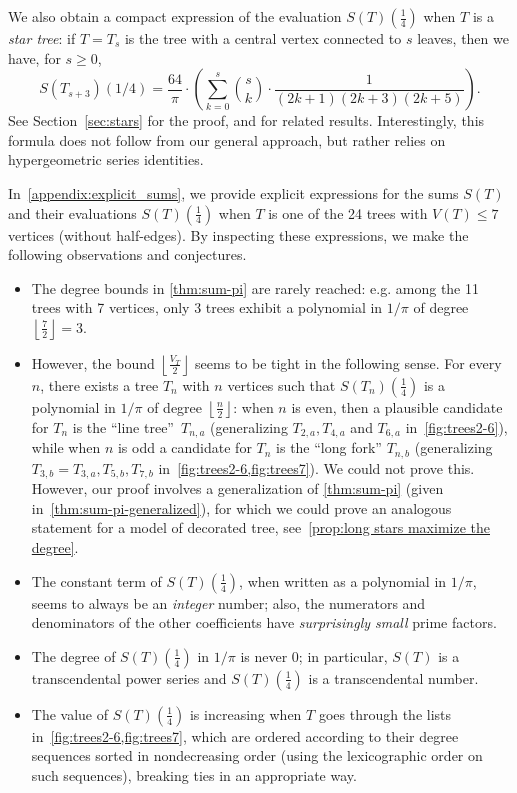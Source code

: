 \documentclass[12pt]{amsart}
\theoremstyle{plain}
\theoremstyle{remark}
\begin{document}
We also obtain a compact expression of the evaluation $S ( T )(\frac{1}{4})$ when $T$ is a \emph{star tree}: if $T=T_s$ is the tree
with a central vertex connected to $s$ leaves, then we have, for $s\geq 0$,
\begin{equation}
\label{eq:stars}
S(T_{s+3})(1/4)  = 
\frac{64}{\pi} \cdot \left(
\sum_{k=0}^s   {\binom{s}{k}} \cdot \frac{1}{\left(2 k +1\right) \left(2 k +3\right) \left(2 k +5\right)}\right) .
\end{equation}
See Section~\ref{sec:stars} for the proof, and for related results. Interestingly, this formula does not follow from
our general approach, but rather relies on hypergeometric series identities.

In~\cref{appendix:explicit_sums}, we provide explicit expressions for the sums $S(T)$ and their evaluations $S(T)\left(
\frac14 \right)$ when $T$ is one of the 24 trees with $V(T) \leq 7$ vertices (without half-edges).
By inspecting these expressions, we make the following observations and conjectures.
\begin{itemize}
\item The degree bounds in \cref{thm:sum-pi} are rarely reached: e.g. among the 11 trees with 7 vertices, only 3 trees exhibit a polynomial in $1/\pi$ of degree $\left\lfloor \frac{7}{2} \right\rfloor=3$.
\item However, the bound $\left\lfloor \frac{V_{T}}{2} \right\rfloor$ seems to be tight in the following sense. For every~$n$, there exists a tree $T_n$ with $n$ vertices such that $S(T_n)\left(
\frac14 \right)$ is a polynomial in $1/\pi$ of degree $\left\lfloor \frac{n}{2} \right\rfloor$: when $n$ is even, then a plausible candidate for $T_n$ is the ``line tree''~$T_{n,a}$ (generalizing $T_{2,a}, T_{4,a}$ and $T_{6,a}$ in~\cref{fig:trees2-6}), while when $n$ is odd a candidate for $T_n$ is the ``long fork'' $T_{n,b}$ (generalizing $T_{3,b}=T_{3,a}, T_{5,b}, T_{7,b}$ in~\cref{fig:trees2-6,fig:trees7}). We could not prove this.
However, our proof involves a generalization of \cref{thm:sum-pi}
(given in~\cref{thm:sum-pi-generalized}), for which we could prove an analogous statement for a model of decorated tree, see~\cref{prop:long stars maximize the degree}.
\item The constant term of $S(T)\left(\frac14 \right)$, when written as a polynomial in $1/\pi$, seems to always be an \emph{integer} number; also, the numerators and denominators of the other coefficients have \emph{surprisingly small} prime factors.
\item The degree of  $S(T)\left(\frac14 \right)$ in $1/\pi$ is never $0$; in particular, $S(T)$ is a transcendental power series and  $S(T)\left(\frac14 \right)$ is a transcendental number.
\item The value of $S(T)\left(\frac14 \right)$ is increasing when $T$ goes through the lists in~\cref{fig:trees2-6,fig:trees7}, which are ordered 
 according to their degree sequences sorted in nondecreasing order (using the lexicographic order on such sequences), breaking ties in an appropriate way.
\end{itemize}
\end{document}
